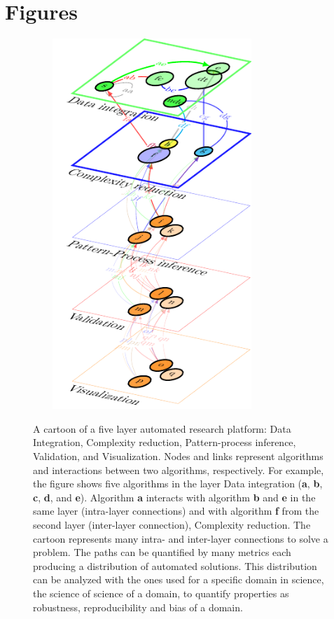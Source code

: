 \documentclass[english,12pt]{article}
\begin{document}
\newpage

\section{Figures}

\vspace{-7 in}
\begin{figure}
  \vspace{-7 in}
\begin{center}
  \hspace{-0.5 in}\includegraphics[width=9cm,height=14cm]{Figure1.pdf}\\
\end{center}
\caption{A cartoon of a five layer automated research platform: Data
  Integration, Complexity reduction, Pattern-process inference,
  Validation, and Visualization. Nodes and links represent algorithms
  and interactions between two algorithms, respectively. For example,
  the figure shows five algorithms in the layer Data integration
  ({\bf a}, {\bf b}, {\bf c}, {\bf d}, and {\bf e}). Algorithm {\bf a}
  interacts with algorithm {\bf b} and {\bf e} in the same layer
  (intra-layer connections) and with algorithm {\bf f} from the second
  layer (inter-layer connection), Complexity reduction. The cartoon
  represents many intra- and inter-layer connections to solve a
  problem. The paths can be quantified by many metrics each producing
  a distribution of automated solutions. This distribution can be
  analyzed with the ones used for a specific domain in science, the
  science of science of a domain, to quantify properties as
  robustness, reproducibility and bias of a domain.}
\label{}
\end{figure}
  
\end{document}
